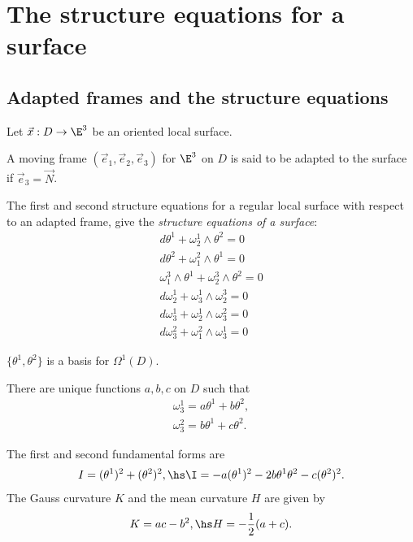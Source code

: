 \documentclass{article}
\begin{document}
\section{The structure equations for a surface}

\subsection{Adapted frames and the structure equations}

Let $\vec x: D \to \E^3$ be an oriented local surface.

\begin{definition}[Notes 11.1]
    A moving frame $(\vec e_1, \vec e_2, \vec e_3)$ for $\E^3$ on $D$
    is said to be adapted to the surface if $\vec e_3 = \vec N$.
\end{definition}

\begin{proposition}[Notes 11.2]
    The first and second structure equations for a regular local surface 
    with respect to an adapted frame, give the \emph{structure equations
    of a surface}:
    \begin{align*}
        d\theta^1 + \omega_2^1\wedge\theta^2 = 0\\
        d\theta^2 + \omega_1^2\wedge\theta^1 = 0\\
        \omega_1^3\wedge\theta^1 + \omega_2^3\wedge\theta^2 = 0\\
        d\omega_2^1+\omega_3^1\wedge\omega_2^3 = 0\\
        d\omega_3^1 + \omega_2^1 \wedge \omega_3^2 = 0\\
        d\omega_3^2 + \omega_1^2 \wedge \omega_3^1 = 0
    \end{align*}
\end{proposition}

\begin{lemma}[Notes 11.3]
    $\{\theta^1, \theta^2\}$ is a basis for $\Omega^1(D)$. 
\end{lemma}

\begin{lemma}
    There are unique functions $a,b,c$ on $D$ such that 
    \begin{align*}
        \omega_3^1 = a\theta^1+b\theta^2,\\
        \omega_3^2 = b\theta^1+c\theta^2.
    \end{align*}
\end{lemma}

\begin{proposition}
    The first and second fundamental forms are 
    \begin{align*}
        I = (\theta^1)^2 + (\theta^2)^2,\hs 
        \I = -a(\theta^1)^2-2b\theta^1\theta^2-c(\theta^2)^2.
    \end{align*}
    The Gauss curvature $K$ and the mean curvature $H$ are given by 
    \begin{align*}
        K=ac-b^2, \hs H=-\frac{1}{2}(a+c).
    \end{align*}
\end{proposition}
\end{document}

